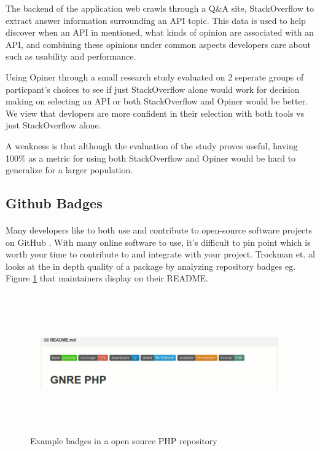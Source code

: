\documentclass[12pt]{article}
\begin{document}
The backend of the application web crawls through a Q\&A site, StackOverflow \cite{stackoverflow} to extract answer
information surrounding an API topic. This data is used to help discover when an API in mentioned, what kinds of opinion
are associated with an API, and combining these opinions under common aspects developers care about such as usability and performance.

Using Opiner \cite{opiner} through a small research study evaluated on 2 seperate groups of particpant's choices to see if 
just StackOverflow \cite{stackoverflow} alone would work for decision making on selecting an API or both StackOverflow and Opiner would be better.
We view that devlopers are more confident in their selection with both tools vs just StackOverflow alone. 

A weakness is that although the evaluation of the study proves useful, having 100\% as a metric for using both StackOverflow and Opiner
would be hard to generalize for a larger population. 

\subsection{Github Badges}
\paragraph{}
Many developers like to both use and contribute to open-source software projects on GitHub \cite{github}. 
With many online software to use, it's difficult to pin point which is worth your time to contribute to and integrate with your project.
Trockman et. al \cite{githubbadges} looks at the in depth quality of a package by analyzing repository badges eg. Figure \ref{phpbadge} that maintainers display on their README.

\begin{figure}
    \centering
    \includegraphics[width=\textwidth,height=6cm,keepaspectratio=true]{gnrephpbadges}
    \caption{
        Example badges in a open source PHP repository \protect\cite{badgeimage}
    }
    \label{phpbadge}
\end{figure}
\end{document}
